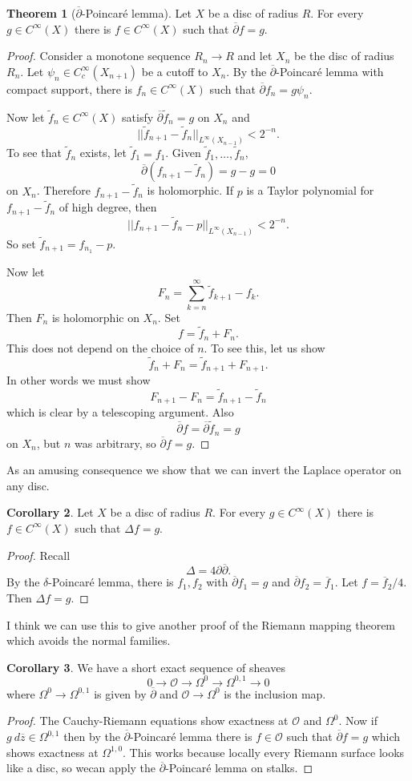 \documentclass[12pt]{book}
\newcommand{\Olo}{\mathscr O}
\newcommand{\dbar}{\overline\partial}
\theoremstyle{definition}
\newtheorem{theorem}{Theorem}[chapter]
\newtheorem{corollary}[theorem]{Corollary}
\begin{document}
\begin{theorem}[$\dbar$-Poincar\'e lemma]
Let $X$ be a disc of radius $R$. For every $g \in C^\infty(X)$ there is $f \in C^\infty(X)$ such that $\dbar f = g$.
\end{theorem}
\begin{proof}
Consider a monotone sequence $R_n \to R$ and let $X_n$ be the disc of radius $R_n$.
Let $\psi_n \in C^\infty_c(X_{n+1})$ be a cutoff to $X_n$.
By the $\dbar$-Poincar\'e lemma with compact support, there is $f_n \in C^\infty(X)$ such that $\dbar f_n = g\psi_n$.

Now let $\tilde f_n \in C^\infty(X)$ satisfy $\dbar \tilde f_n = g$ on $X_n$ and
$$||\tilde f_{n+1} - \tilde f_n||_{L^\infty(X_{n-1})} < 2^{-n}.$$
To see that $\tilde f_n$ exists, let $\tilde f_1 = f_1$.
Given $\tilde f_1, \dots, \tilde f_n$,
$$\dbar(f_{n+1} - \tilde f_n) = g - g = 0$$
on $X_n$. Therefore $f_{n+1} - \tilde f_n$ is holomorphic.
If $p$ is a Taylor polynomial for $f_{n+1} - \tilde f_n$ of high degree, then
$$||f_{n+1} - \tilde f_n - p||_{L^\infty(X_{n-1})} < 2^{-n}.$$
So set $\tilde f_{n+1} = f_{n_1} - p$.

Now let
$$F_n = \sum_{k=n}^\infty \tilde f_{k+1} - f_k.$$
Then $F_n$ is holomorphic on $X_n$.
Set
$$f = \tilde f_n + F_n.$$
This does not depend on the choice of $n$.
To see this, let us show
$$\tilde f_n + F_n = \tilde f_{n+1} + F_{n+1}.$$
In other words we must show
$$F_{n+1} - F_n = \tilde f_{n+1} - \tilde f_n $$
which is clear by a telescoping argument.
Also
$$\dbar f = \dbar \tilde f_n = g$$
on $X_n$, but $n$ was arbitrary, so $\dbar f = g$.
\end{proof}

As an amusing consequence we show that we can invert the Laplace operator on any disc.

\begin{corollary}
Let $X$ be a disc of radius $R$. For every $g \in C^\infty(X)$ there is $f \in C^\infty(X)$ such that $\Delta f = g$.
\end{corollary}
\begin{proof}
Recall
$$\Delta = 4\partial \dbar.$$
By the $\delta$-Poincar\'e lemma, there is $f_1,f_2$ with $\dbar f_1 = g$ and $\dbar f_2 = \overline f_1$.
Let $f = \overline f_2/4$. Then $\Delta f = g$.
\end{proof}

I think we can use this to give another proof of the Riemann mapping theorem which avoids the normal families.

\begin{corollary}
We have a short exact sequence of sheaves
$$0 \to \Olo \to \Omega^0 \to \Omega^{0,1} \to 0$$
where $\Omega^0 \to \Omega^{0,1}$ is given by $\dbar$ and $\Olo \to \Omega^0$ is the inclusion map.
\end{corollary}
\begin{proof}
The Cauchy-Riemann equations show exactness at $\Olo$ and $\Omega^0$.
Now if $g ~d\overline z \in \Omega^{0,1}$ then by the $\dbar$-Poincar\'e lemma there is $f \in \Olo$ such that $\dbar f = g$ which shows exactness at $\Omega^{1,0}$.
This works because locally every Riemann surface looks like a disc, so wecan apply the $\dbar$-Poincar\'e lemma on stalks.
\end{proof}
\end{document}
